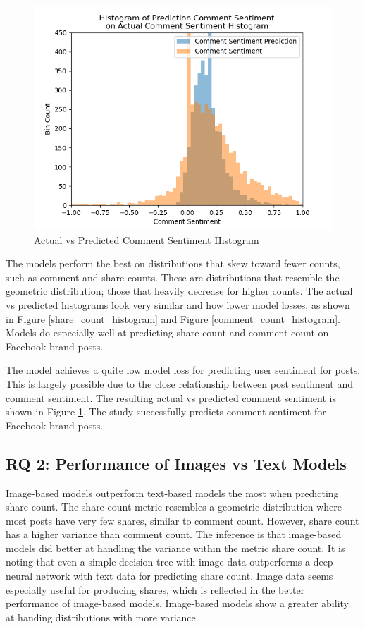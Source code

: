 \documentclass[mksc,blindrev]{informs3} %
\begin{document}
\begin{figure}
\centering
\includegraphics[width=\columnwidth]{images/Sentiment_Prediction_vs_Actual.png}
\caption{Actual vs Predicted Comment Sentiment Histogram}
\label{comment_sentiment_histogram}
\end{figure}

The models perform the best on distributions that skew toward fewer counts, such as comment and share counts. These are distributions that resemble the geometric distribution; those that heavily decrease for higher counts. The actual vs predicted histograms look very similar and how lower model losses, as shown in Figure \ref{share_count_histogram} and Figure \ref{comment_count_histogram}. Models do especially well at predicting share count and comment count on Facebook brand posts.

The model achieves a quite low model loss for predicting user sentiment for posts. This is largely possible due to the close relationship between post sentiment and comment sentiment. The resulting actual vs predicted comment sentiment is shown in Figure \ref{comment_sentiment_histogram}. The study successfully predicts comment sentiment for Facebook brand posts.

\subsection{RQ 2: Performance of Images vs Text Models}

Image-based models outperform text-based models the most when predicting share count. The share count metric resembles a geometric distribution where most posts have very few shares, similar to comment count. However, share count has a higher variance than comment count. The inference is that image-based models did better at handling the variance within the metric share count. It is noting that even a simple decision tree with image data outperforms a deep neural network with text data for predicting share count. Image data seems especially useful for producing shares, which is reflected in the better performance of image-based models. Image-based models show a greater ability at handing distributions with more variance.
\end{document}
